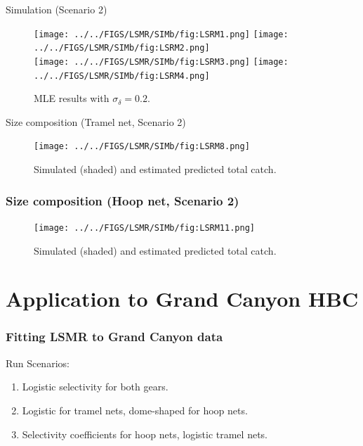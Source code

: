 \documentclass{beamer}
\begin{document}
\begin{frame}{Simulation (Scenario 2)}
	\begin{figure}[htbp]
		\centering
			\texttt{[image: ../../FIGS/LSMR/SIMb/fig:LSRM1.png]}
			\texttt{[image: ../../FIGS/LSMR/SIMb/fig:LSRM2.png]}\\
			\texttt{[image: ../../FIGS/LSMR/SIMb/fig:LSRM3.png]}
			\texttt{[image: ../../FIGS/LSMR/SIMb/fig:LSRM4.png]}
		\caption{MLE results with $\sigma_\delta = 0.2$.}
		\label{fig:FIGS_LSMR_SIMb_fig:LSRM1}
	\end{figure}
	
		
\end{frame}

\begin{frame}{Size composition (Tramel net, Scenario 2)}
	\only<1>
	{
		\begin{figure}[htbp]
			\centering
				\texttt{[image: ../../FIGS/LSMR/SIMb/fig:LSRM8.png]}
			\caption{Simulated (shaded) and estimated predicted total catch.}
			\label{fig:FIGS_LSMR_SIMb_fig:LSRM8}
		\end{figure}
	}
	{
	\frametitle{Size composition (Hoop net, Scenario 2)}
		\begin{figure}[htbp]
			\centering
				\texttt{[image: ../../FIGS/LSMR/SIMb/fig:LSRM11.png]}
			\caption{Simulated (shaded) and estimated predicted total catch.}
			\label{fig:FIGS_LSMR_SIMb_fig:LSRM11}
		\end{figure}
	}
	
\end{frame}


\section[Grand Canyon]{Application to Grand Canyon HBC} %
\label{sec:application_to_grand_canyon_hbc}
\begin{frame}
	\frametitle{Fitting LSMR to Grand Canyon data}
	\begin{block}{Run Scenarios:}
		\begin{enumerate}
			\item Logistic selectivity for both gears.
			\item Logistic for tramel nets, dome-shaped for hoop nets.
			\item Selectivity coefficients for hoop nets, logistic tramel nets.
		\end{enumerate}
		
	\end{block}
\end{frame}
\end{document}
